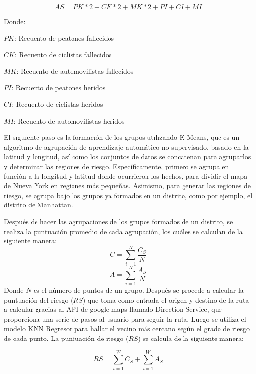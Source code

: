 \begin{equation} 
	AS = PK*2+CK*2+MK*2+PI+CI+MI
\end{equation}

	Donde:

$PK$: Recuento de peatones fallecidos

$CK$: Recuento de ciclistas fallecidos

$MK$: Recuento de automovilistas fallecidos

$PI$: Recuento de peatones heridos

$CI$: Recuento de ciclistas heridos

$MI$: Recuento de automovilistas heridos

El siguiente paso es la formación de los grupos utilizando K Means, que es un algoritmo de agrupación de aprendizaje automático no supervisado, basado en la latitud y longitud, así como los conjuntos de datos se concatenan para agruparlos y determinar las regiones de riesgo. Específicamente, primero se agrupa en función a la longitud y latitud donde ocurrieron los hechos, para dividir el mapa de Nueva York en regiones más pequeñas. Asimismo, para generar las regiones de riesgo, se agrupa bajo los grupos ya formados en un distrito, como por ejemplo, el distrito de Manhattan. 

Después de hacer las agrupaciones de los grupos formados de un distrito, se realiza la puntuación promedio de cada agrupación, los cuáles se calculan de la siguiente manera:
\begin{equation} 
	C = \sum_{i = 1}^{N}\frac{C_{S}}{N}
\end{equation}
\begin{equation} 
	A = \sum_{i = 1}^{N}\frac{A_{S}}{N}
\end{equation}
Donde $N$ es el número de puntos de un grupo. Después se procede a calcular la puntuación del riesgo ($RS$) que toma como entrada el origen y destino de la ruta a calcular gracias al API de google maps llamado Direction Service,  que proporciona una serie de pasos al usuario para seguir la ruta. Luego se utiliza el modelo KNN Regresor para hallar el vecino más cercano según el grado de riesgo de cada punto. La puntuación de riesgo ($RS$) se calcula de la siguiente manera: 


\begin{equation} 
	RS = \sum_{i=1}^{W}C_{S} + \sum_{i=1}^{W}A_{S}
\end{equation}

